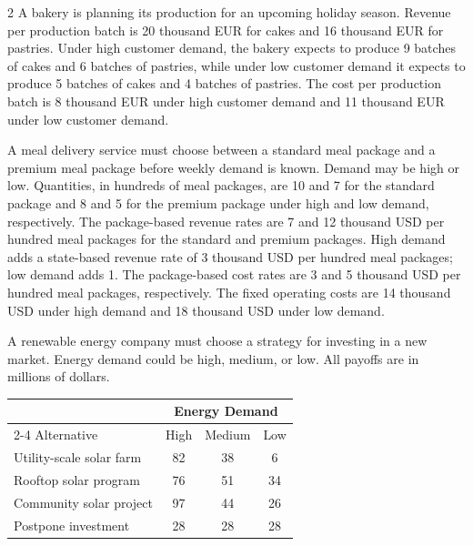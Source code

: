 \begin{multicols}{2}
		A bakery is planning its production for an upcoming holiday season. Revenue per production batch is 20 thousand EUR for cakes and 16 thousand EUR for pastries. Under high customer demand, the bakery expects to produce 9 batches of cakes and 6 batches of pastries, while under low customer demand it expects to produce 5 batches of cakes and 4 batches of pastries. The cost per production batch is 8 thousand EUR under high customer demand and 11 thousand EUR under low customer demand.
		
		A meal delivery service must choose between a standard meal package and a premium meal package before weekly demand is known. Demand may be high or low. Quantities, in hundreds of meal packages, are 10 and 7 for the standard package and 8 and 5 for the premium package under high and low demand, respectively. The package-based revenue rates are 7 and 12 thousand USD per hundred meal packages for the standard and premium packages. High demand adds a state-based revenue rate of 3 thousand USD per hundred meal packages; low demand adds 1. The package-based cost rates are 3 and 5 thousand USD per hundred meal packages, respectively. The fixed operating costs are 14 thousand USD under high demand and 18 thousand USD under low demand.
		
		\columnbreak
		
		
		A renewable energy company must choose a strategy for investing in a new market. Energy demand could be high, medium, or low. All payoffs are in millions of dollars.
		
		\begin{center}
			\renewcommand{\arraystretch}{1.3}
			\small
			\begin{tabular}{lccc}
				\toprule
				& \multicolumn{3}{c}{Energy Demand} \\
				\cmidrule(lr){2-4}
				Alternative & High & Medium & Low \\
				\midrule
				Utility-scale solar farm & 82 & 38 & 6 \\
				Rooftop solar program & 76 & 51 & 34 \\
				Community solar project & 97 & 44 & 26 \\
				Postpone investment & 28 & 28 & 28 \\
				\bottomrule
			\end{tabular}
		\end{center}
		\vspace{-5mm}
		

\end{multicols}
